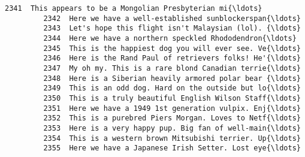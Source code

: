 \documentclass[11pt]{article}
\begin{document}
\begin{Verbatim}[commandchars=\\\{\}]
         2341  This appears to be a Mongolian Presbyterian mi{\ldots}   
         2342  Here we have a well-established sunblockerspan{\ldots}   
         2343  Let's hope this flight isn't Malaysian (lol). {\ldots}   
         2344  Here we have a northern speckled Rhododendron{\ldots}   
         2345  This is the happiest dog you will ever see. Ve{\ldots}   
         2346  Here is the Rand Paul of retrievers folks! He'{\ldots}   
         2347  My oh my. This is a rare blond Canadian terrie{\ldots}   
         2348  Here is a Siberian heavily armored polar bear {\ldots}   
         2349  This is an odd dog. Hard on the outside but lo{\ldots}   
         2350  This is a truly beautiful English Wilson Staff{\ldots}   
         2351  Here we have a 1949 1st generation vulpix. Enj{\ldots}   
         2352  This is a purebred Piers Morgan. Loves to Netf{\ldots}   
         2353  Here is a very happy pup. Big fan of well-main{\ldots}   
         2354  This is a western brown Mitsubishi terrier. Up{\ldots}   
         2355  Here we have a Japanese Irish Setter. Lost eye{\ldots}   
         

\end{Verbatim}
\end{document}
